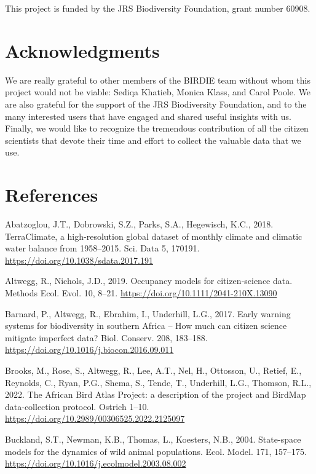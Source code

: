 \documentclass[utf8]{frontiersSCNS}
\begin{document}
This project is funded by the JRS Biodiversity Foundation, grant number
60908.

\hypertarget{acknowledgments}{%
\section*{Acknowledgments}\label{acknowledgments}}

We are really grateful to other members of the BIRDIE team without whom
this project would not be viable: Sediqa Khatieb, Monica Klass, and
Carol Poole. We are also grateful for the support of the JRS
Biodiversity Foundation, and to the many interested users that have
engaged and shared useful insights with us. Finally, we would like to
recognize the tremendous contribution of all the citizen scientists that
devote their time and effort to collect the valuable data that we use.

\hypertarget{references}{%
\section*{References}\label{references}}

Abatzoglou, J.T., Dobrowski, S.Z., Parks, S.A., Hegewisch, K.C., 2018.
TerraClimate, a high-resolution global dataset of monthly climate and
climatic water balance from 1958--2015. Sci. Data 5, 170191.
\url{https://doi.org/10.1038/sdata.2017.191}

Altwegg, R., Nichols, J.D., 2019. Occupancy models for citizen‐science
data. Methods Ecol. Evol. 10, 8--21.
\url{https://doi.org/10.1111/2041-210X.13090}

Barnard, P., Altwegg, R., Ebrahim, I., Underhill, L.G., 2017. Early
warning systems for biodiversity in southern Africa -- How much can
citizen science mitigate imperfect data? Biol. Conserv. 208, 183--188.
\url{https://doi.org/10.1016/j.biocon.2016.09.011}

Brooks, M., Rose, S., Altwegg, R., Lee, A.T., Nel, H., Ottosson, U.,
Retief, E., Reynolds, C., Ryan, P.G., Shema, S., Tende, T., Underhill,
L.G., Thomson, R.L., 2022. The African Bird Atlas Project: a description
of the project and BirdMap data-collection protocol. Ostrich 1--10.
\url{https://doi.org/10.2989/00306525.2022.2125097}

Buckland, S.T., Newman, K.B., Thomas, L., Koesters, N.B., 2004.
State-space models for the dynamics of wild animal populations. Ecol.
Model. 171, 157--175.
\url{https://doi.org/10.1016/j.ecolmodel.2003.08.002}
\end{document}
